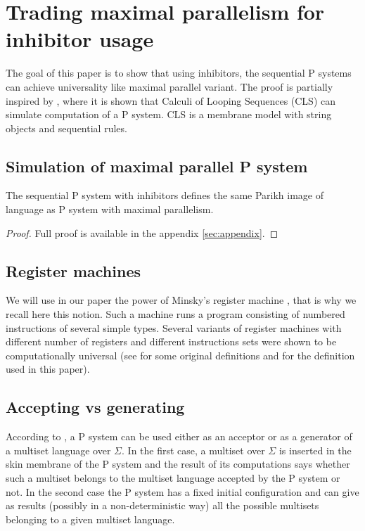 \documentclass[llncs,submission,copyright,creativecommons]{../lib/lncs/llncs}
\begin{document}
\section{Trading maximal parallelism for inhibitor usage}
\label{sec:inhibitors}
The goal of this paper is to show that using inhibitors, the sequential P systems can achieve universality like maximal parallel variant. The proof is partially inspired by \cite{Barbuti07thecalculus}, where it is shown that Calculi of Looping Sequences (CLS) can simulate computation of a P system. CLS is a membrane model with string objects and sequential rules.



\subsection{Simulation of maximal parallel P system} %
\label{sub:simulation_of_maximal_parallel_p_system}

\begin{theorem}
\label{theorem:inhibitors_generative_universal}
  The sequential P system with inhibitors defines the same Parikh image of language as P system with maximal parallelism.
\end{theorem}

\begin{proof}
  Full proof is available in the appendix \ref{sec:appendix}.
\end{proof}

\subsection{Register machines} %
\label{sub:register_machines}
  We will use in our paper the power of Minsky's register machine \cite{Ionescu:jucs_10_5:on_p_systems_with}, that is why we recall here this notion. Such a machine runs a program consisting of numbered instructions of several simple types. Several variants of register machines with different number of registers and different instructions sets were shown to be computationally universal (see \cite{Ibarra:2005:SPS:2111772.2111880} for some original definitions and \cite{Khrisna03threeuniversality} for the definition used in this paper).


  

\subsection{Accepting vs generating} %
\label{sub:accepting_vs_generating}
  According to \cite{Barbuti:2010:MSW:1946067.1946081}, a P system can be used either as an acceptor or as a generator of a multiset language over $\Sigma$. In the first case, a multiset over $\Sigma$ is inserted in the skin membrane of the P system and the result of its computations says whether such a multiset belongs to the multiset language accepted by the P system or not. In the second case the P system has a fixed initial configuration and can give as results (possibly in a non-deterministic way) all the possible multisets belonging to a given multiset language.
\end{document}
